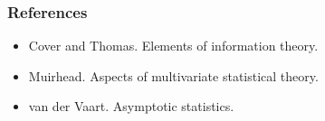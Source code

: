 \documentclass{beamer}
\begin{document}
\begin{frame}
\frametitle{References}
\begin{itemize}
\item Cover and Thomas.  Elements of information theory.
\item Muirhead.  Aspects of multivariate statistical theory.
\item van der Vaart.  Asymptotic statistics.
\end{itemize}
\end{frame}
\end{document}
